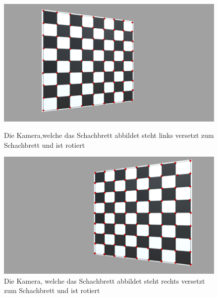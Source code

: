 \begin{figure}[!htb]
	\includegraphics[width=\linewidth]{images/ChessBoardLeft.png}
	\caption[Korrespondezsuche mit Sortierungsalgorithmus. Schachbrett auf linker Seite]{Die Kamera,welche das Schachbrett abbildet steht links versetzt zum Schachbrett und ist rotiert}
	\label{fig:ChessBoardLeft}
	\endminipage\hfill
	\includegraphics[width=\linewidth]{images/ChessBoardRight.png}
	\caption[Korrespondezsuche mit Sortierungsalgorithmus. Schachbrett auf rechter Seite]{Die Kamera, welche das Schachbrett abbildet steht rechts versetzt zum Schachbrett und ist rotiert}
	\label{fig:ChessBoardRight}
	\endminipage\hfill
\end{figure}


